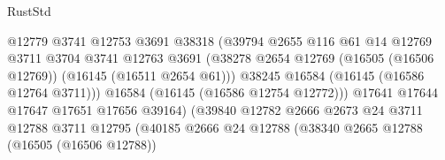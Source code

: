 \begin{lexlean}{RustStd}
\begin{coremodule}
                                            @12779
                                            @3741
                                            @12753
                                            @3691
                                            @38318
                                            (@39794
                                              @2655
                                              @116
                                              @61
                                              @14
                                              @12769
                                              @3711
                                              @3704
                                              @3741
                                              @12763
                                              @3691
                                              (@38278
                                                @2654
                                                @12769
                                                (@16505 (@16506 @12769))
                                                (@16145 (@16511 @2654 @61)))
                                              @38245
                                              @16584
                                              (@16145 (@16586 @12764 @3711)))
                                            @16584
                                            (@16145 (@16586 @12754 @12772)))
                                          @17641
                                          @17644
                                          @17647
                                          @17651
                                          @17656
                                          @39164)
                                        (@39840
                                          @12782
                                          @2666
                                          @2673
                                          @24
                                          @3711
                                          @12788
                                          @3711
                                          @12795
                                          (@40185
                                            @2666
                                            @24
                                            @12788
                                            (@38340
                                              @2665
                                              @12788
                                              (@16505 (@16506 @12788))

\end{coremodule}
\end{lexlean}
